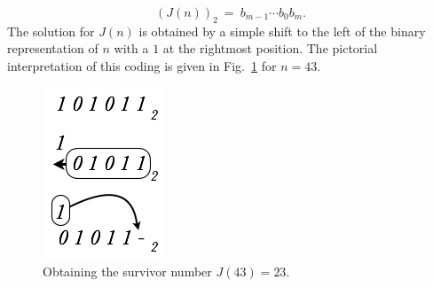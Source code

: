 \begin{itemize}
\[ (J(n))_2 \ = \ b_{m-1} \cdots b_0 b_m. \]
The solution for $J(n)$ is obtained by a simple shift to the left of the binary representation of $n$
with a $1$ at the rightmost position.
The pictorial interpretation of this coding is given in Fig.~\ref{fig:josephusCoding} for $n=43$.
\begin{figure}[h]
\begin{center}
        \includegraphics[scale=0.4]{FiguresMaths/josephusCoding}
        \caption{Obtaining the survivor number $J(43)=23$.}
        \label{fig:josephusCoding}
\end{center}
\end{figure}

\end{itemize}


